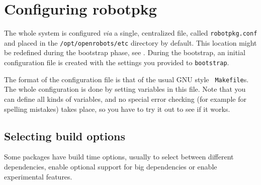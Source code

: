 %
%
%
%
%

\section{Configuring robotpkg} %

The whole \robotpkg system is configured  {\em via} a single, centralized file,
called {\tt   robotpkg.conf}  and  placed  in  the   {\tt  /opt/openrobots/etc}
directory  by default.  This location  might be redefined  during the bootstrap
phase,  see  .
During    the  bootstrap, an initial configuration     file is created with the
settings you provided to {\tt bootstrap}.

The  format of  the configuration file   is that of   the usual GNU style  {\tt
Makefile}s. The whole \robotpkg configuration  is done by setting variables  in
this  file. Note that  you can  define all  kinds of  variables, and no special
error checking (for example for spelling mistakes)  takes place, so you have to
try it out to see if it works.


\subsection{Selecting build options} %

Some packages have   build time options, usually   to select between  different
dependencies,  enable  optional   support for    big   dependencies or   enable
experimental features.

